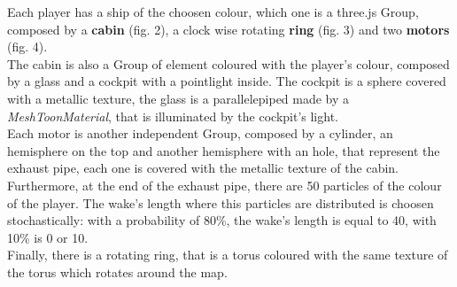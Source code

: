 \documentclass[11pt]{article}
\begin{document}
	Each player has a ship of the choosen colour, which one is a three.js Group, composed by a \textbf{cabin} (fig. 2), a clock wise rotating \textbf{ring} (fig. 3) and two \textbf{motors} (fig. 4).\\
	
	The cabin is also a Group of element coloured with the player's colour, composed by a glass and a cockpit with a pointlight inside.
	The cockpit is a sphere covered with a metallic texture, the glass is a parallelepiped made by a \textit{MeshToonMaterial}, that is illuminated by the cockpit's light.\\
	
	Each motor is another independent Group, composed by a cylinder, an hemisphere on the top and another hemisphere with an hole, that represent the exhaust pipe, each one is covered with the metallic texture of the cabin.
	Furthermore, at the end of the exhaust pipe, there are 50 particles of the colour of the player. The wake's length where this particles are distributed is choosen stochastically: with a probability of 80\%, the wake's length is equal to 40, with 10\% is 0 or 10.\\
	
	Finally, there is a rotating ring, that is a torus coloured with the same texture of the torus which rotates around the map.
	
\end{document}
